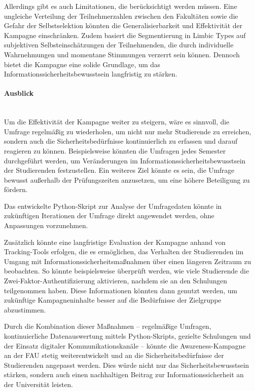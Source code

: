 \documentclass[german,report]{i1thesis}
\begin{document}
Allerdings gibt es auch Limitationen, die berücksichtigt werden müssen. Eine ungleiche Verteilung der Teilnehmerzahlen zwischen den Fakultäten sowie die Gefahr der Selbstselektion könnten die Generalisierbarkeit und Effektivität der Kampagne einschränken. Zudem basiert die Segmentierung in Limbic Types auf subjektiven Selbsteinschätzungen der Teilnehmenden, die durch individuelle Wahrnehmungen und momentane Stimmungen verzerrt sein können. Dennoch bietet die Kampagne eine solide Grundlage, um das Informationssicherheitsbewusstsein langfristig zu stärken.

\paragraph{Ausblick}
\mbox{}
\\
Um die Effektivität der Kampagne weiter zu steigern, wäre es sinnvoll, die Umfrage regelmäßig zu wiederholen, um nicht nur mehr Studierende zu erreichen, sondern auch die Sicherheitsbedürfnisse kontinuierlich zu erfassen und darauf reagieren zu können. Beispielsweise könnten die Umfragen jedes Semester durchgeführt werden, um Veränderungen im Informationssicherheitsbewusstsein der Studierenden festzustellen. Ein weiteres Ziel könnte es sein, die Umfrage bewusst außerhalb der Prüfungszeiten anzusetzen, um eine höhere Beteiligung zu fördern.

Das entwickelte Python-Skript zur Analyse der Umfragedaten könnte in zukünftigen Iterationen der Umfrage direkt angewendet werden, ohne Anpassungen vorzunehmen.

Zusätzlich könnte eine langfristige Evaluation der Kampagne anhand von Tracking-Tools erfolgen, die es ermöglichen, das Verhalten der Studierenden im Umgang mit Informationssicherheitsmaßnahmen über einen längeren Zeitraum zu beobachten. So könnte beispielsweise überprüft werden, wie viele Studierende die Zwei-Faktor-Authentifizierung aktivieren, nachdem sie an den Schulungen teilgenommen haben. Diese Informationen könnten dann genutzt werden, um zukünftige Kampagneninhalte besser auf die Bedürfnisse der Zielgruppe abzustimmen.

Durch die Kombination dieser Maßnahmen – regelmäßige Umfragen, kontinuierliche Datenauswertung mittels Python-Skripts, gezielte Schulungen und der Einsatz digitaler Kommunikationskanäle – könnte die Awareness-Kampagne an der FAU stetig weiterentwickelt und an die Sicherheitsbedürfnisse der Studierenden angepasst werden. Dies würde nicht nur das Sicherheitsbewusstsein stärken, sondern auch einen nachhaltigen Beitrag zur Informationssicherheit an der Universität leisten.
\end{document}
